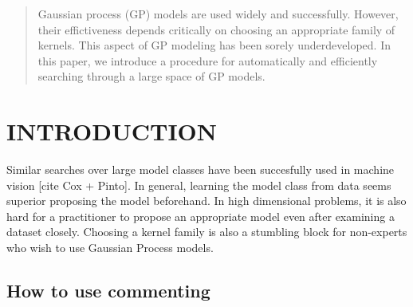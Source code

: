 \documentclass[twoside]{article}
\begin{document}
%

%


\begin{abstract}
Gaussian process (GP) models are used widely and successfully.  However, their effictiveness depends critically on choosing an appropriate family of kernels.  This aspect of GP modeling has been sorely underdeveloped.  In this paper, we introduce a procedure for automatically and efficiently searching through a large space of GP models.
\end{abstract}

\section{INTRODUCTION}

Similar searches over large model classes have been succesfully used in machine vision [cite Cox + Pinto].  In general, learning the model class from data seems superior proposing the model beforehand.  In high dimensional problems, it is also hard for a practitioner to propose an appropriate model even after examining a dataset closely.  Choosing a kernel family is also a stumbling block for non-experts who wish to use Gaussian Process models.

\subsection{How to use commenting}

\end{document}
